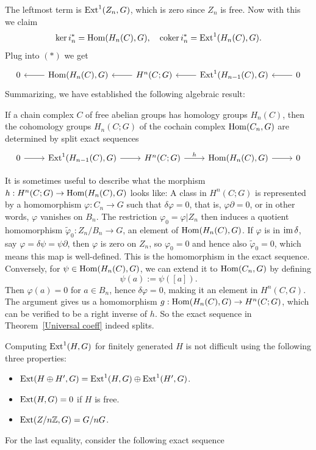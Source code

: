 The leftmost term is $\mathrm{Ext}^1(Z_n,G)$, which is zero since $Z_n$ is free. Now with this we claim 
\[\mathrm{ker}\, i^*_n=\mathrm{Hom}(H_n(C),G),\quad \mathrm{coker}\, i^*_n=\mathrm{Ext}^1(H_n(C),G).\]
Plug into $(\ast)$ we get
\[\begin{tikzcd}
0&\Hom(H_{n}(C),G)\ar[l]&H^n(C;G)\ar[l]&\Ext^1(H_{n-1}(C),G)\ar[l]&0\ar[l]
\end{tikzcd}\]
Summarizing, we have established the following algebraic result:
\begin{theorem}\label{Universal coeff}
If a chain complex $C$ of free abelian groups has homology groups $H_n(C)$, then the cohomology groups $H_n(C;G)$ of the cochain complex $\mathrm{Hom}(C_n,G)$ are determined by split exact sequences
\[\begin{tikzcd}
0\ar[r]&\Ext^1(H_{n-1}(C),G)\ar[r]&H^n(C;G)\ar[r,"h"]&\Hom(H_{n}(C),G)\ar[r]&0
\end{tikzcd}\]
\end{theorem}
It is sometimes useful to describe what the morphism $h:H^n(C;G)\to\mathrm{Hom}(H_n(C),G)$ looks like: A class in $H^n(C;G)$ is
represented by a homomorphism $\varphi:C_n\to G$ such that $\delta\varphi=0$, that is, $\varphi\partial=0$, or in other words, $\varphi$ vanishes on $B_n$. The restriction $\varphi_0=\varphi|Z_n$ then induces a quotient homomorphism $\widetilde{\varphi}_0:Z_n/B_n\to G$, an element of $\mathrm{Hom}(H_n(C),G)$. If $\varphi$ is in $\mathrm{im}\,\delta$, say $\varphi=\delta\psi=\psi\partial$, then $\varphi$ is zero on $Z_n$, so $\varphi_0=0$ and hence also $\widetilde{\varphi}_0=0$, which means this map is well-defined. This is the homomorphism in the exact sequence. Conversely, for $\psi\in\mathrm{Hom}(H_n(C),G)$, we can extend it to $\mathrm{Hom}(C_n,G)$ by defining 
\[\psi(a):=\psi([a]).\]
Then $\varphi(a)=0$ for $a\in B_n$, hence $\delta\varphi=0$, making it an element in $H^n(C,G)$. The argument gives us a homomorphism $g:\mathrm{Hom}(H_n(C),G)\to H^n(C;G)$, which can be verified to be a right inverse of $h$. So the exact sequence in Theorem~\ref{Universal coeff} indeed splits.\par
Computing $\mathrm{Ext}^1(H,G)$ for finitely generated $H$ is not difficult using the following three properties:
\begin{itemize}
\item $\mathrm{Ext}(H\oplus H',G)=\mathrm{Ext}^1(H,G)\oplus\mathrm{Ext}^1(H',G)$.
\item $\mathrm{Ext}(H,G)=0$ if $H$ is free.
\item $\mathrm{Ext}(Z/n\mathbb{Z},G)=G/nG$.
\end{itemize}
For the last equality, consider the following exact sequence
